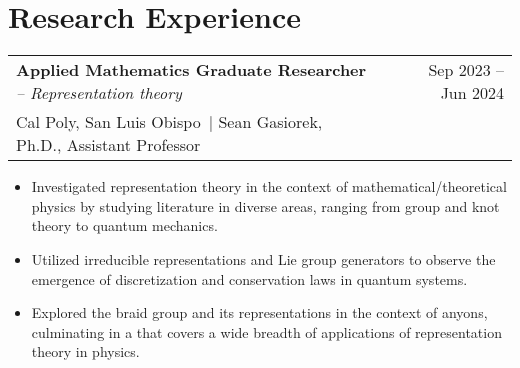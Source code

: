 \documentclass[a4paper,11pt]{article}
\makeatletter
\newcommand{\colhref}[3]{\href{#2}{\color{#1}{#3}}} %
\newenvironment{jobcustomlong}[4]
    {
    \begin{tabularx}{\linewidth}{@{}l X r@{}}
    \textbf{#1} \textit{#2} & \hfill &  #3 \\[-2.5pt]
    \textcolor{black!55!white}{\small #4} \\[2.5pt]
    \end{tabularx}
    \begin{minipage}[t]{\linewidth}
    \begin{itemize}[nosep,after=\strut, leftmargin=1.75em, itemsep=1pt,label={\small$\bullet$}]
    }
    {
    \end{itemize} \vspace{.325em}
    \end{minipage}   
    }
\newcommand{\calpoly}{\textcolor{black!55!white}{Cal Poly, San Luis Obispo}}
\makeatother
\begin{document}
\section{Research Experience} %
\begin{jobcustomlong}{Applied Mathematics Graduate Researcher}{-- Representation theory}{Sep 2023 -- Jun 2024}{\calpoly\ $\vert$ Sean Gasiorek, Ph.D., Assistant Professor}
    \item Investigated representation theory in the context of mathematical/theoretical physics by studying literature in diverse areas, ranging from group and knot theory to quantum mechanics.
    \item Utilized irreducible representations and Lie group generators to observe the emergence of discretization and conservation laws in quantum systems.
    \item Explored the braid group and its representations in the context of anyons, culminating in a \colhref{blue!65!black}{https://digitalcommons.calpoly.edu/theses/2844/}{master's thesis} that covers a wide breadth of applications of representation theory in physics.
\end{jobcustomlong}
\end{document}
